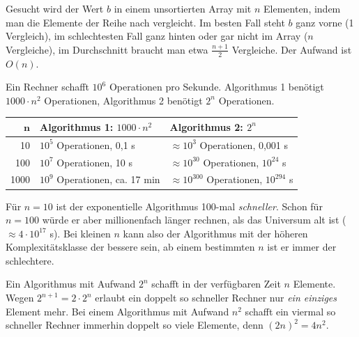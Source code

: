 Gesucht wird der Wert $b$ in einem unsortierten Array mit $n$ Elementen, indem man die Elemente der Reihe nach vergleicht. Im besten Fall steht $b$ ganz vorne (1 Vergleich), im schlechtesten Fall ganz hinten oder gar nicht im Array ($n$ Vergleiche), im Durchschnitt braucht man etwa $\frac{n+1}{2}$ Vergleiche. Der Aufwand ist $O(n)$.

Ein Rechner schafft $10^6$ Operationen pro Sekunde. Algorithmus 1 benötigt $1000 \cdot n^2$ Operationen, Algorithmus 2 benötigt $2^n$ Operationen.
\begin{center}
\begin{tabular}{@{}rll@{}}
\toprule
$\boldsymbol{n}$ & \textbf{Algorithmus 1:} $1000 \cdot n^2$ & \textbf{Algorithmus 2:} $2^n$ \\
\midrule
10 & $10^5$ Operationen, 0,1 s & $\approx 10^3$ Operationen, 0,001 s \\
100 & $10^7$ Operationen, 10 s & $\approx 10^{30}$ Operationen, $10^{24}$ s \\
1000 & $10^9$ Operationen, ca. 17 min & $\approx 10^{300}$ Operationen, $10^{294}$ s \\
\bottomrule
\end{tabular}
\end{center}
Für $n = 10$ ist der exponentielle Algorithmus 100-mal \emph{schneller}. Schon für $n = 100$ würde er aber millionenfach länger rechnen, als das Universum alt ist ($\approx 4 \cdot 10^{17}$ s). Bei kleinen $n$ kann also der Algorithmus mit der höheren Komplexitätsklasse der bessere sein, ab einem bestimmten $n$ ist er immer der schlechtere.

Ein Algorithmus mit Aufwand $2^n$ schafft in der verfügbaren Zeit $n$ Elemente. Wegen $2^{n+1} = 2 \cdot 2^n$ erlaubt ein doppelt so schneller Rechner nur \emph{ein einziges} Element mehr. Bei einem Algorithmus mit Aufwand $n^2$ schafft ein viermal so schneller Rechner immerhin doppelt so viele Elemente, denn $(2n)^2 = 4n^2$.

